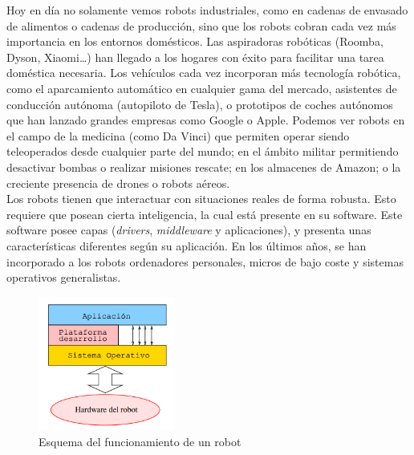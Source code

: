 Hoy en día no solamente vemos robots industriales, como en cadenas de envasado de alimentos o cadenas de producción, sino que los robots cobran cada vez más importancia en los entornos domésticos. Las aspiradoras robóticas (Roomba, Dyson, Xiaomi…) han llegado a los hogares con éxito para facilitar una tarea doméstica necesaria. Los vehículos cada vez incorporan más tecnología robótica, como el aparcamiento automático en cualquier gama del mercado, asistentes de conducción autónoma (autopiloto de Tesla), o prototipos de coches autónomos que han lanzado grandes empresas como Google o Apple. Podemos ver robots en el campo de la medicina (como Da Vinci) que permiten operar siendo teleoperados desde cualquier parte del mundo; en el ámbito militar permitiendo desactivar bombas o realizar misiones rescate; en los almacenes de Amazon; o la creciente presencia de drones o robots aéreos.\\

Los robots tienen que interactuar con situaciones reales de forma robusta. Esto requiere que posean cierta inteligencia, la cual está presente en su software. Este software posee capas (\textit{drivers}, \textit{middleware} y aplicaciones), y presenta unas características diferentes según su aplicación. En los últimos años, se han incorporado a los robots ordenadores personales, micros de bajo coste y sistemas operativos generalistas.

\begin{figure}[H]
  \begin{center}
    \includegraphics[width=0.4\textwidth]{figures/Introduccion/Esquema_Robot.png}
		\caption{Esquema del funcionamiento de un robot}
		\label{fig.Esquema_Robot}
		\end{center}
\end{figure}


